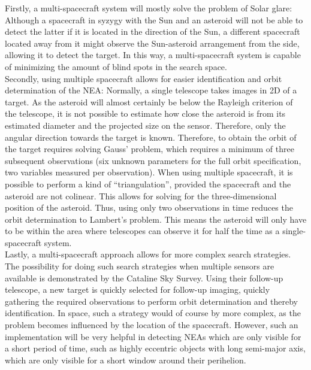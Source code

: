 Firstly, a multi-spacecraft system will mostly solve the problem of Solar glare: Although a spacecraft in syzygy with the Sun and an asteroid will not be able to detect the latter if it is located in the direction of the Sun, a different spacecraft located away from it might observe the Sun-asteroid arrangement from the side, allowing it to detect the target. In this way, a multi-spacecraft system is capable of minimizing the amount of blind spots in the search space. \\

Secondly, using multiple spacecraft allows for easier identification and orbit determination of the NEA: Normally, a single telescope takes images in 2D of a target. As the asteroid will almost certainly be below the Rayleigh criterion of the telescope, it is not possible to estimate how close the asteroid is from its estimated diameter and the projected size on the sensor. Therefore, only the angular direction towards the target is known. Therefore, to obtain the orbit of the target requires solving Gauss' problem, which requires a minimum of three subsequent observations (six unknown parameters for the full orbit specification, two variables measured per observation). When using multiple spacecraft, it is possible to perform a kind of ``triangulation'', provided the spacecraft and the asteroid are not colinear. This allows for solving for the three-dimensional position of the asteroid. Thus, using only two observations in time reduces the orbit determination to Lambert's problem. This means the asteroid will only have to be within the area where telescopes can observe it for half the time as a single-spacecraft system. \\

Lastly, a multi-spacecraft approach allows for more complex search strategies. The possibility for doing such search strategies when multiple sensors are available is demonstrated by the Cataline Sky Survey. Using their follow-up telescope, a new target is quickly selected for follow-up imaging, quickly gathering the required observations to perform orbit determination and thereby identification. In space, such a strategy would of course by more complex, as the problem becomes influenced by the location of the spacecraft. However, such an implementation will be very helpful in detecting NEAs which are only visible for a short period of time, such as highly eccentric objects with long semi-major axis, which are only visible for a short window around their perihelion. \\

